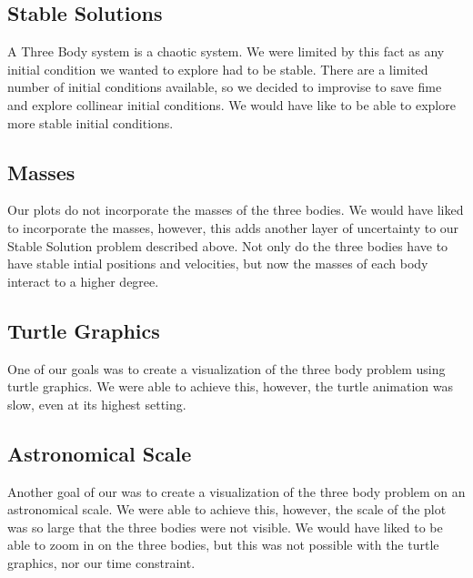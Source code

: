 \documentclass{article}
\begin{document}
\subsection{Stable Solutions}
A Three Body system is a chaotic system. We were limited by this fact as any initial condition we wanted to explore had to be stable. There are a limited number of initial conditions available, so we decided to improvise to save fime and explore collinear initial conditions. We would have like to be able to explore more stable initial conditions.

\subsection{Masses}
Our plots do not incorporate the masses of the three bodies. We would have liked to incorporate the masses, however, this adds another layer of uncertainty to our Stable Solution problem described above. Not only do the three bodies have to have stable intial positions and velocities, but now the masses of each body interact to a higher degree.

\subsection{Turtle Graphics}
One of our goals was to create a visualization of the three body problem using turtle graphics. We were able to achieve this, however, the turtle animation was slow, even at its highest setting.

\subsection{Astronomical Scale}
Another goal of our was to create a visualization of the three body problem on an astronomical scale. We were able to achieve this, however, the scale of the plot was so large that the three bodies were not visible. We would have liked to be able to zoom in on the three bodies, but this was not possible with the turtle graphics, nor our time constraint.
\end{document}
